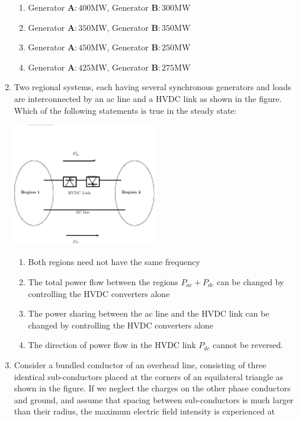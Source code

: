 \documentclass[journal,12pt,onecolumn]{IEEEtran}
\theoremstyle{remark}
\begin{document}
\begin{enumerate}
    \begin{enumerate}
        \item Generator $\mathbf{A} \colon 400$MW, Generator $\mathbf{B} \colon 300$MW
         \item Generator $\mathbf{A} \colon 350$MW, Generator $\mathbf{B} \colon 350$MW
          \item Generator $\mathbf{A} \colon 450$MW, Generator $\mathbf{B} \colon 250$MW
           \item Generator $\mathbf{A} \colon 425$MW, Generator $\mathbf{B} \colon 275$MW\\
    \end{enumerate}
    \item Two regional systems, each having several synchronous generators and loads are interconnected by an ac line and a HVDC link as shown in the figure. Which of the following statements is true in the steady state:
	     \begin{center}

\includegraphics[width=0.5\textwidth]{figs/fig5/main} 
\end{center}

\begin{enumerate}
    \item  Both regions need not have the same frequency 
\item The total power flow between the regions $P_{ac} + P_{dc}$ can be changed by controlling the HVDC converters alone 
\item The power sharing between the ac line and the HVDC link can be changed by controlling the HVDC converters alone 
\item The direction of power flow in the HVDC link $P_{dc}$ cannot be reversed.\\
\end{enumerate}
\item Consider a bundled conductor of an overhead line, consisting of three identical sub-conductors placed at the corners of an equilateral triangle as shown in the figure. If we neglect the charges on the other phase conductors and ground, and assume that spacing between sub-conductors is much larger than their radius, the maximum electric field intensity is experienced at
	 \begin{center}


\end{center}
\end{enumerate}
\end{document}
